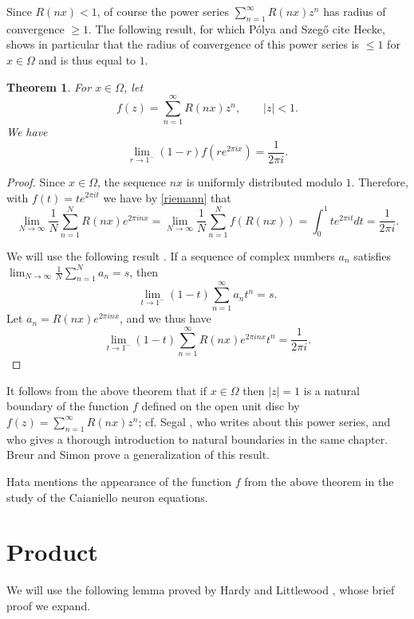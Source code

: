 \documentclass{amsart}
\newtheorem{theorem}{Theorem}
\begin{document}
Since $R(nx) <1$, of course the power series $\sum_{n=1}^\infty R(nx) z^n$ has radius of convergence $\geq 1$.  
The following result, for which P\'olya and Szeg\H o \cite[p.~280, Part II, No. 168]{polyaI}  cite Hecke, shows in particular that the radius of convergence of this power series is
$\leq 1$ for $x \in \Omega$ and is thus equal to $1$.

\begin{theorem}
For $x \in \Omega$, let
\[
f(z)=\sum_{n=1}^\infty R(nx) z^n,\qquad |z|<1.
\]
We have
\[
\lim_{r \to 1^-} (1-r) f(re^{2\pi i x}) = \frac{1}{2\pi i }.
\]
\end{theorem}
\begin{proof}
Since $x \in \Omega$, the sequence $nx$ is uniformly distributed modulo $1$. Therefore, with
$f(t)=te^{2\pi i t}$ we have by \eqref{riemann} that
\[
\lim_{N \to \infty} \frac{1}{N} \sum_{n=1}^N R(nx) e^{2\pi inx} =
\lim_{N \to \infty} \frac{1}{N} \sum_{n=1}^N f(R(nx))=
 \int_0^1 te^{2\pi i t} dt=\frac{1}{2\pi i}.
\]

We will use the following result \cite[p.~21, Part I, No. 88]{polyaI}.
If a sequence of complex numbers $a_n$  satisfies
$\lim_{N \to \infty} \frac{1}{N} \sum_{n=1}^N a_n=s$, then
\[
\lim_{t \to 1^-} (1-t)\sum_{n=1}^\infty a_n t^n=s.
\]
Let $a_n=R(nx) e^{2\pi inx}$, and we thus have
\[
\lim_{t \to 1^-} (1-t)\sum_{n=1}^\infty R(nx) e^{2\pi inx} t^n=\frac{1}{2\pi i}.
\]
\end{proof}

It follows from the above theorem that if $x \in \Omega$ then
$|z|=1$ is a natural boundary of the function $f$ defined on the open unit disc by $f(z)=\sum_{n=1}^\infty R(nx)z^n$; cf. Segal \cite[p.~255, Chapter 6]{segal}, who writes about this
power series, and who gives a thorough introduction to natural boundaries in the same chapter.
Breur and Simon \cite{breuer} prove a generalization of this result.





Hata \cite[p.~173, Problem 12.6]{hata} 
mentions the appearance of the function  $f$ from the above theorem in the study of the Caianiello neuron equations. 




\section{Product}
We will use the following lemma proved by Hardy and Littlewood \cite[p.~89]{XXIV},  whose brief proof we expand.
\end{document}
